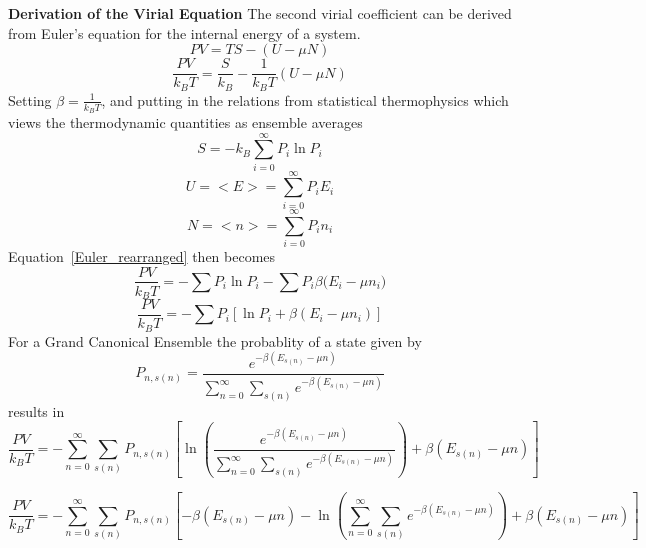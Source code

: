 \documentclass[12pt]{article}
\begin{document}
\noindent \textbf{Derivation of the Virial Equation}
The second virial coefficient can be derived from Euler's equation for the internal energy of a system.
\begin{equation}PV=TS-(U-\mu{N})\end{equation}
\begin{equation}\label{Euler_rearranged}\frac{PV}{k_BT}=\frac{S}{k_B}-\frac{1}{k_BT}(U-\mu{N})\end{equation}
Setting $\beta=\frac{1}{k_BT}$, and putting in the relations from statistical thermophysics which views the thermodynamic quantities as ensemble averages
\begin{equation}S=-k_B\sum_{i=0}^\infty{P_i\ln{P_i}}\end{equation}
\begin{equation}U=<E>=\sum_{i=0}^\infty{P_iE_i}\end{equation}
\begin{equation}N=<n>=\sum_{i=0}^\infty{P_in_i}\end{equation}
Equation~\ref{Euler_rearranged} then becomes
\begin{equation}\frac{PV}{k_BT}=-\sum{P_i\ln{P_i}}-\sum{P_i\beta(E_i-\mu
{n_i}})\end{equation}
\begin{equation}\frac{PV}{k_BT}=-\sum{P_i}\left[\ln{P_i}+\beta(E_i-\mu
{n_i})\right]\end{equation}
For a Grand Canonical Ensemble the probablity of a state given by
\begin{equation}P_{n,s(n)}=\frac{e^{-\beta(E_{s(n)}-\mu{n})}}{\sum_{n=0}^\infty\sum_{s(n)}e^{-\beta(E_{s(n)}-\mu{n})}}\end{equation}
results in 
\begin{equation}\frac{PV}{k_BT}=-\sum_{n=0}^\infty\sum_{s(n)}P_{n,s(n)}\left[\ln{\left(\frac{ e^{-\beta(E_{s(n)}-\mu{n})}}{\sum_{n=0}^\infty\sum_{s(n)}e^{-\beta(E_{s(n)}-\mu{n})}}\right)}+\beta(E_{s(n)}-\mu{n})\right]\end{equation}

\begin{equation}\frac{PV}{k_BT}=-\sum_{n=0}^\infty\sum_{s(n)}P_{n,s(n)}\left[-\beta(E_{s(n)}-\mu{n})-\ln{\left(\sum_{n=0}^\infty\sum_{s(n)}e^{-\beta(E_{s(n)}-\mu{n})}\right)}+\beta(E_{s(n)}-\mu{n})\right]\end{equation}
\end{document}
